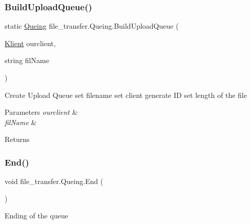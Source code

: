 \subsubsection{\texorpdfstring{Build\+Upload\+Queue()}{BuildUploadQueue()}}
{\footnotesize\ttfamily static \hyperlink{classfile__transfer_1_1_queing}{Queing} file\+\_\+transfer.\+Queing.\+Build\+Upload\+Queue (\begin{DoxyParamCaption}\item[{\hyperlink{classfile__transfer_1_1_klient}{Klient}}]{ourclient,  }\item[{string}]{fil\+Name }\end{DoxyParamCaption})\hspace{0.3cm}{\ttfamily [static]}}





Create Upload Queue set filename set client generate ID set length of the file 


\begin{DoxyParams}{Parameters}
{\em ourclient} & \\
\hline
{\em fil\+Name} & \\
\hline
\end{DoxyParams}
\begin{DoxyReturn}{Returns}

\end{DoxyReturn}
\mbox{\label{classfile__transfer_1_1_queing_a5846bc9bacb3fb4184ed40ed58596f73}} 
\subsubsection{\texorpdfstring{End()}{End()}}
{\footnotesize\ttfamily void file\+\_\+transfer.\+Queing.\+End (\begin{DoxyParamCaption}{ }\end{DoxyParamCaption})}



Ending of the queue 

\mbox{\label{classfile__transfer_1_1_queing_ab2d66f889262646deb7cf406bf47d163}} 
